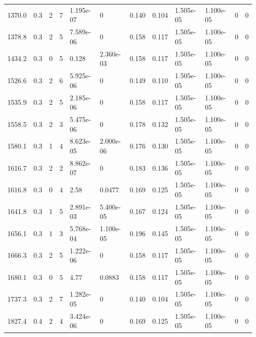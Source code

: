 \documentclass[preview]{standalone}
\begin{document}
{{{\begin{tabular}{L{1.2cm}C{1.2cm} C{0.3cm}C{0.5cm} C{1.4cm}C{1.4cm} C{1.4cm}C{1.4cm} C{1.6cm}C{1.6cm} C{1.6cm}C{1.6cm}}
  1370.0  &   0.3  & 2     &  7 &  1.195e-07  & 0  &  0.140&   0.104& 1.505e-05 & 1.100e-05   &  0 & 0  \\ 
  1378.8  &   0.3  & 2     &  5 &  7.589e-06  & 0  &  0.158&   0.117& 1.505e-05 & 1.100e-05   &  0 & 0  \\ 
  1434.2  &   0.3  & 0     &  5 &  0.128  & 2.360e-03  &  0.158&   0.117& 1.505e-05 & 1.100e-05   &  0 & 0  \\ 
  1526.6  &   0.3  & 2     &  6 &  5.925e-06  & 0  &  0.149&   0.110& 1.505e-05 & 1.100e-05   &  0 & 0  \\ 
  1535.9  &   0.3  & 2     &  5 &  2.185e-06  & 0  &  0.158&   0.117& 1.505e-05 & 1.100e-05   &  0 & 0  \\ 
  1558.5  &   0.3  & 2     &  3 &  5.475e-06  & 0  &  0.178&   0.132& 1.505e-05 & 1.100e-05   &  0 & 0  \\ 
  1580.1  &   0.3  & 1     &  4 &  8.623e-05  & 2.000e-06  &  0.176&   0.130& 1.505e-05 & 1.100e-05   &  0 & 0  \\ 
  1616.7  &   0.3  & 2     &  2 &  8.862e-07  & 0  &  0.183&   0.136& 1.505e-05 & 1.100e-05   &  0 & 0  \\ 
  1616.8  &   0.3  & 0     &  4 &  2.58  & 0.0477  &  0.169&   0.125& 1.505e-05 & 1.100e-05   &  0 & 0  \\ 
  1641.8  &   0.3  & 1     &  5 &  2.891e-03  & 5.400e-05  &  0.167&   0.124& 1.505e-05 & 1.100e-05   &  0 & 0  \\ 
  1656.1  &   0.3  & 1     &  3 &  5.768e-04  & 1.100e-05  &  0.196&   0.145& 1.505e-05 & 1.100e-05   &  0 & 0  \\ 
  1666.3  &   0.3  & 2     &  5 &  1.222e-06  & 0  &  0.158&   0.117& 1.505e-05 & 1.100e-05   &  0 & 0  \\ 
  1680.1  &   0.3  & 0     &  5 &  4.77  & 0.0883  &  0.158&   0.117& 1.505e-05 & 1.100e-05   &  0 & 0  \\ 
  1737.3  &   0.3  & 2     &  7 &  1.282e-05  & 0  &  0.140&   0.104& 1.505e-05 & 1.100e-05   &  0 & 0  \\ 
  1827.4  &   0.4  & 2     &  4 &  3.424e-06  & 0  &  0.169&   0.125& 1.505e-05 & 1.100e-05   &  0 & 0  \\ 
\hline 
\end{tabular} 

}}}
\end{document}
